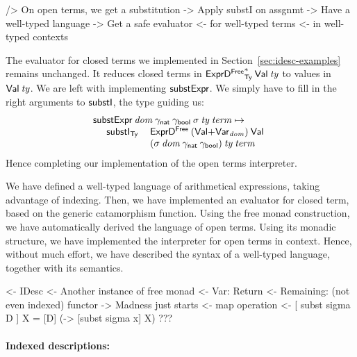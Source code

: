 \begin{wstructure}
    /> On open terms, we get a substitution
        -> Apply substI on assgnmt
            -> Have a well-typed language
            -> Get a safe evaluator 
                <- for well-typed terms 
                <- in well-typed contexts
\end{wstructure}

The evaluator for closed terms we implemented in
Section~\ref{sec:idesc-examples} remains unchanged. It reduces closed
terms in $\FreeIMonad{\HExprFreeD}{\Ty}{\SYMBVal}\: \V{ty}$ to values in
$\Val{\V{ty}}$. We are left with implementing $\substH$. We simply
have to fill in the right arguments to $\substI$, the type guiding us:
%
\[\stk{
\substH\: \V{dom}\:
          \gammaNat\: \gammaBool\:
          \V{\sigma}\: 
          \V{ty}\: 
          \V{term} \mapsto  \\
\;\;\ \begin{array}{ll}
       \substI_{\Ty}\: &  \HExprFreeD\: 
                         (\SUM{\SYMBVal}{\Var{\V{dom}}{}})\: 
                         \SYMBVal \\
                      &
                        (\V{\sigma}\: \V{dom}\: \gammaNat\: \gammaBool)\:
                        \V{ty}\:
                        \V{term}
      \end{array}
}\]
%
Hence completing our implementation of the open terms interpreter. 

We have defined a well-typed language of arithmetical expressions,
taking advantage of indexing. Then, we have implemented an evaluator
for closed term, based on the generic catamorphism function. Using the
free monad construction, we have automatically derived the language of
open terms. Using its monadic structure, we have implemented the
interpreter for open terms in context. Hence, without much effort, we
have described the syntax of a well-typed language, together with its
semantics.

\begin{wstructure}
<- IDesc
    <- Another instance of free monad
        <- Var: Return
        <- Remaining: (not even indexed) functor
    -> Madness just starts
        <- map operation
        <- [ subst sigma D ] X = [D] (\x -> [subst sigma x] X)
        ???
\end{wstructure}

\paragraph{Indexed descriptions:}

